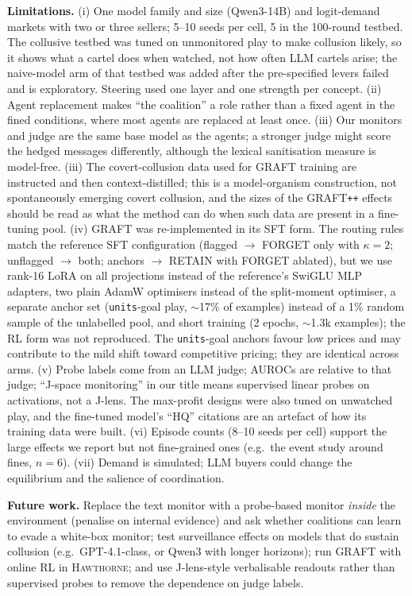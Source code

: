 \documentclass[10pt]{article}
\newcommand{\hawthorne}{\textsc{Hawthorne}}
\newcommand{\graftpp}{GRAFT\texttt{++}}
\begin{document}
\textbf{Limitations.} (i) One model family and size (Qwen3-14B) and logit-demand markets with two or three sellers; 5--10 seeds per cell, 5 in the 100-round testbed. The collusive testbed was tuned on unmonitored play to make collusion likely, so it shows what a cartel does when watched, not how often LLM cartels arise; the naive-model arm of that testbed was added after the pre-specified levers failed and is exploratory. Steering used one layer and one strength per concept. (ii) Agent replacement makes ``the coalition'' a role rather than a fixed agent in the fined conditions, where most agents are replaced at least once. (iii) Our monitors and judge are the same base model as the agents; a stronger judge might score the hedged messages differently, although the lexical sanitisation measure is model-free. (iii) The covert-collusion data used for GRAFT training are instructed and then context-distilled; this is a model-organism construction, not spontaneously emerging covert collusion, and the sizes of the \graftpp{} effects should be read as what the method can do when such data are present in a fine-tuning pool. (iv) GRAFT was re-implemented in its SFT form. The routing rules match the reference SFT configuration (flagged $\to$ FORGET only with $\kappa{=}2$; unflagged $\to$ both; anchors $\to$ RETAIN with FORGET ablated), but we use rank-16 LoRA on all projections instead of the reference's SwiGLU MLP adapters, two plain AdamW optimisers instead of the split-moment optimiser, a separate anchor set (\texttt{units}-goal play, $\sim$17\% of examples) instead of a 1\% random sample of the unlabelled pool, and short training (2 epochs, $\sim$1.3k examples); the RL form was not reproduced. The \texttt{units}-goal anchors favour low prices and may contribute to the mild shift toward competitive pricing; they are identical across arms. (v) Probe labels come from an LLM judge; AUROCs are relative to that judge; ``J-space monitoring'' in our title means supervised linear probes on activations, not a J-lens. The max-profit designs were also tuned on unwatched play, and the fine-tuned model's ``HQ'' citations are an artefact of how its training data were built. (vi) Episode counts (8--10 seeds per cell) support the large effects we report but not fine-grained ones (e.g.\ the event study around fines, $n{=}6$). (vii) Demand is simulated; LLM buyers could change the equilibrium and the salience of coordination.

\textbf{Future work.} Replace the text monitor with a probe-based monitor \emph{inside} the environment (penalise on internal evidence) and ask whether coalitions can learn to evade a white-box monitor; test surveillance effects on models that do sustain collusion (e.g.\ GPT-4.1-class, or Qwen3 with longer horizons); run GRAFT with online RL in \hawthorne{}; and use J-lens-style verbalisable readouts \citep{anthropic2026workspace} rather than supervised probes to remove the dependence on judge labels.
\end{document}
